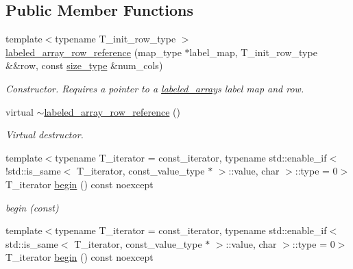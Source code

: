 \subsection*{Public Member Functions}
\begin{DoxyCompactItemize}
\item 
{\footnotesize template$<$typename T\+\_\+init\+\_\+row\+\_\+type $>$ }\\\hyperlink{classIceBRG_1_1labeled__array__row__reference_aa5b99a997fb1c6a92aff73d093300bca}{labeled\+\_\+array\+\_\+row\+\_\+reference} (map\+\_\+type $\ast$label\+\_\+map, T\+\_\+init\+\_\+row\+\_\+type \&\&row, const \hyperlink{classIceBRG_1_1labeled__array__row__reference_a80c5d11ebfa639fa27894ce288633df0}{size\+\_\+type} \&num\+\_\+cols)
\begin{DoxyCompactList}\small\item\em Constructor. Requires a pointer to a \hyperlink{classIceBRG_1_1labeled__array}{labeled\+\_\+array}\textquotesingle{}s label map and row. \end{DoxyCompactList}\item 
virtual \hyperlink{classIceBRG_1_1labeled__array__row__reference_a87c88e311e4178e7d945eac0349f16ec}{$\sim$labeled\+\_\+array\+\_\+row\+\_\+reference} ()
\begin{DoxyCompactList}\small\item\em Virtual destructor. \end{DoxyCompactList}\item 
{\footnotesize template$<$typename T\+\_\+iterator  = const\+\_\+iterator, typename std\+::enable\+\_\+if$<$!std\+::is\+\_\+same$<$ T\+\_\+iterator, const\+\_\+value\+\_\+type $\ast$ $>$\+::value, char $>$\+::type  = 0$>$ }\\T\+\_\+iterator \hyperlink{classIceBRG_1_1labeled__array__row__reference_a3e3cf78cfef5f00b83417cbbfb692443}{begin} () const  noexcept
\begin{DoxyCompactList}\small\item\em begin (const) \end{DoxyCompactList}\item 
{\footnotesize template$<$typename T\+\_\+iterator  = const\+\_\+iterator, typename std\+::enable\+\_\+if$<$ std\+::is\+\_\+same$<$ T\+\_\+iterator, const\+\_\+value\+\_\+type $\ast$ $>$\+::value, char $>$\+::type  = 0$>$ }\\T\+\_\+iterator \hyperlink{classIceBRG_1_1labeled__array__row__reference_a3e3cf78cfef5f00b83417cbbfb692443}{begin} () const  noexcept
\item 

\end{DoxyCompactItemize}
